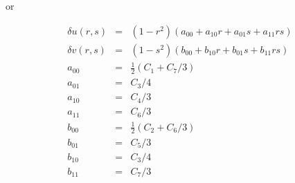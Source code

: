 or 


\begin{mdframed}[backgroundcolor=blue!5]
\begin{eqnarray}
\delta u(r,s) &=& (1-r^2) (a_{00} + a_{10} r + a_{01} s + a_{11} rs ) \nonumber\\
\delta v(r,s) &=& (1-s^2) (b_{00} + b_{10} r + b_{01} s + b_{11} rs ) \nonumber\\
a_{00} &=& \frac12 (C_1 + C_7/3) \nonumber\\
a_{01} &=& C_3/4 \nonumber\\
a_{10} &=& C_4/3 \nonumber\\
a_{11} &=& C_6/3 \nonumber\\
b_{00} &=& \frac12 (C_2 + C_6/3) \nonumber\\
b_{01} &=& C_5/3 \nonumber\\
b_{10} &=& C_3/4 \nonumber\\
b_{11} &=& C_7/3\nonumber 
\end{eqnarray}
\end{mdframed}









